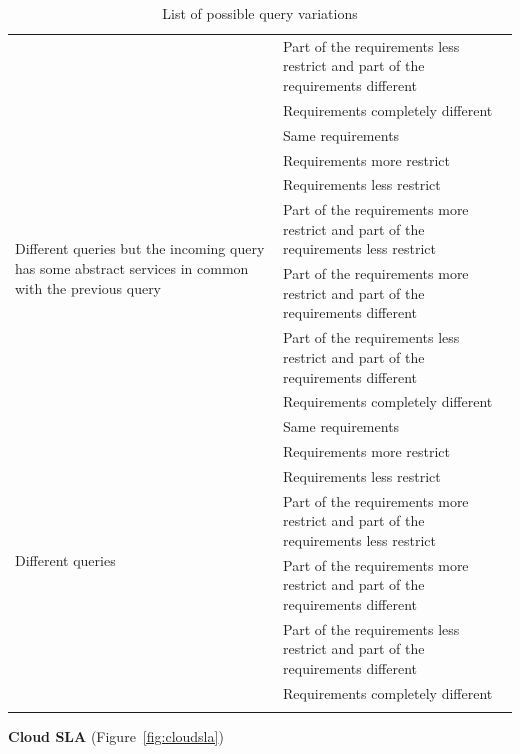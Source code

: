 \documentclass[12pt,a4paper,oneside]{article}
\begin{document}
\begin{center}
\begin{longtable}{|l|p{8cm}|}
                  & Part of the requirements less restrict and part of the requirements different \\ \cline{2-2} 
                  & Requirements completely different \\ \hline
\multirow{7}{6cm}{Different queries but the incoming query has some abstract services in common with the previous query}  & Same requirements \\ \cline{2-2} 
                  & Requirements more restrict \\ \cline{2-2} 
                  & Requirements less restrict \\ \cline{2-2} 
                  & Part of the requirements more restrict and part of the requirements less restrict \\ \cline{2-2} 
                  & Part of the requirements more restrict and part of the requirements different \\ \cline{2-2} 
                  & Part of the requirements less restrict and part of the requirements different \\ \cline{2-2} 
                  & Requirements completely different \\ \hline
\multirow{7}{6cm}{Different queries} & Same requirements \\ \cline{2-2} 
                  & Requirements more restrict \\ \cline{2-2} 
                  & Requirements less restrict \\ \cline{2-2} 
                  & Part of the requirements more restrict and part of the requirements less restrict \\ \cline{2-2} 
                  & Part of the requirements more restrict and part of the requirements different \\ \cline{2-2} 
                  & Part of the requirements less restrict and part of the requirements different \\ \cline{2-2} 
                  & Requirements completely different \\ \hline
\caption{List of possible query variations\label{tab:big}} \\
\end{longtable}%
\end{center}

\begin{flushleft}
\textbf{Cloud SLA} (Figure~\ref{fig:cloudsla})
\end{flushleft}
\end{document}
